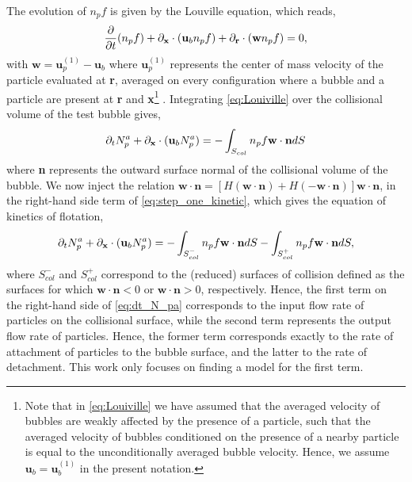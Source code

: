 The evolution of $ n_p f$ is given by the Louville equation, which reads, 
\begin{equation}
    \frac{\partial}{\partial t}(n_p f)
    +\pddx\cdot (\textbf{u}_b n_p f)
    +\pddr\cdot(\textbf{w} n_p f)
    =0, 
    \label{eq:Louiville}
\end{equation}
with $\textbf{w} = \textbf{u}_p^{(1)} - \textbf{u}_b$ where $\textbf{u}_p^{(1)}$ represents the center of mass velocity of the particle evaluated at \textbf{r}, averaged on every configuration where a bubble and a particle are present at \textbf{r} and \textbf{x}\footnote{Note that in \eqref{eq:Louiville} we have assumed that the averaged velocity of bubbles are weakly affected by the presence of a particle, such that the averaged velocity of bubbles conditioned on the presence of a nearby particle is equal to the unconditionally averaged bubble velocity. Hence, we assume $\textbf{u}_b = \textbf{u}_b^{(1)}$ in the present notation.} .
Integrating \eqref{eq:Louiville} over the collisional volume of the test bubble gives,
\begin{equation}
    \pddt N_p^a
    +\pddx\cdot (\textbf{u}_b N_p^a )
    =
    - \int_{S_{col}} n_p f \textbf{w}\cdot \textbf{n} dS
    \label{eq:step_one_kinetic}
\end{equation}
where \textbf{n} represents the outward surface normal of the collisional volume of the bubble.
We now inject the relation $\textbf{w}\cdot \textbf{n} = [H(\textbf{w}\cdot \textbf{n})+H(-\textbf{w}\cdot \textbf{n})] \textbf{w}\cdot \textbf{n}$, in the right-hand side term of \eqref{eq:step_one_kinetic}, which gives the equation of kinetics of flotation, 
\begin{equation}
    \pddt N_p^a
    +\pddx\cdot (\textbf{u}_b N_p^a )
    =
    - \int_{S_{col}^-} n_p f \textbf{w}\cdot \textbf{n} dS
    - \int_{S_{col}^+} n_p f \textbf{w}\cdot \textbf{n} dS,
    \label{eq:dt_N_pa}
\end{equation}
where $S_{col}^-$ and $S_{col}^+$ correspond to the (reduced) surfaces of collision defined as the surfaces for which  $\textbf{w}\cdot \textbf{n}<0$ or $\textbf{w}\cdot \textbf{n} >0$, respectively.  
Hence, the first term on the right-hand side of \eqref{eq:dt_N_pa} corresponds to the input flow rate of particles on the collisional surface, while the second term represents the output flow rate of particles. 
Hence, the former term corresponds exactly to the rate of attachment of particles to the bubble surface, and the latter to the rate of detachment. 
This work only focuses on finding a model for the first term. 


